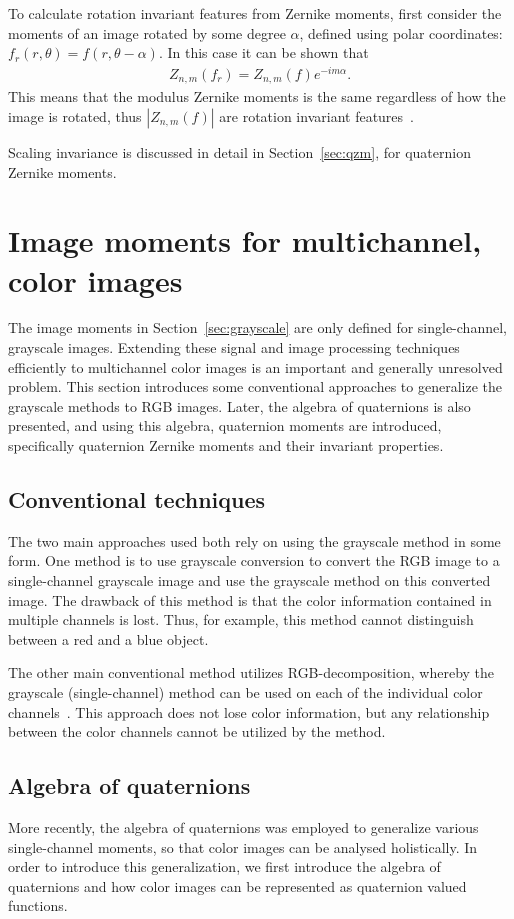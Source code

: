 To calculate rotation invariant features from Zernike moments, first consider the moments of an image rotated by some degree $\alpha$, defined using polar coordinates: $f_{r}(r,\theta) = f(r,\theta - \alpha)$. In this case it can be shown that
\begin{gather*}
    Z_{n,m}(f_r) =  Z_{n,m}(f) e^{-i m\alpha}.
\end{gather*}
This means that the modulus Zernike moments is the same regardless of how the image is rotated, thus $|Z_{n,m}(f)|$ are rotation invariant features~\cite{zernike_moments}.


Scaling invariance is discussed in detail in Section~\ref{sec:qzm}, for quaternion Zernike moments.

\section{Image moments for multichannel, color images}
The image moments in Section~\ref{sec:grayscale} are only defined for single-channel, grayscale images. Extending these signal and image processing techniques efficiently to multichannel color images is an important and generally unresolved problem. This section introduces some conventional approaches to generalize the grayscale methods to RGB images. Later, the algebra of quaternions is also presented, and using this algebra, quaternion moments are introduced, specifically quaternion Zernike moments and their invariant properties.  

\subsection{Conventional techniques}
The two main approaches used both rely on using the grayscale method in some form. One method is to use grayscale conversion to convert the RGB image to a single-channel grayscale image and use the grayscale method on this converted image. The drawback of this method is that the color information contained in multiple channels is lost. Thus, for example, this method cannot distinguish between a red and a blue object.

The other main conventional method utilizes RGB-decomposition, whereby the grayscale (single-channel) method can be used on each of the individual color channels~\cite{affine_color}. This approach does not lose color information, but any relationship between the color channels cannot be utilized by the method.


\subsection{Algebra of quaternions}
More recently, the algebra of quaternions was employed to generalize various single-channel moments, so that color images can be analysed holistically. In order to introduce this generalization, we first introduce the algebra of quaternions and how color images can be represented as quaternion valued functions.


